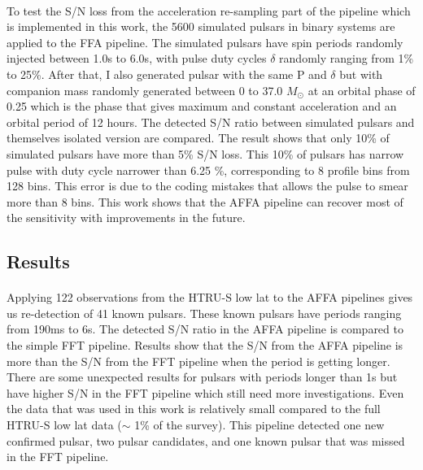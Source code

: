 \documentclass[../chapter1/thesis_msc.tex]{subfiles}
\begin{document}
\paragraph{} To test the S/N loss from the acceleration re-sampling part of the pipeline which is implemented in this work, the 5600 simulated pulsars in binary systems are applied to the FFA pipeline. The simulated pulsars have spin periods randomly injected between 1.0s to 6.0s, with pulse duty cycles $\delta$ randomly ranging from 1\% to 25\%. After that, I also generated pulsar with the same P and $\delta$ but with companion mass randomly generated between 0 to 37.0 $M_\odot$ at an orbital phase of 0.25 which is the phase that gives maximum and constant acceleration and an orbital period of 12 hours. The detected S/N ratio between simulated pulsars and themselves isolated version are compared. The result shows that only 10\% of simulated pulsars have more than 5\% S/N loss. This 10\% of pulsars has narrow pulse with duty cycle narrower than 6.25 \%, corresponding to 8 profile bins from 128 bins. This error is due to the coding mistakes that allows the pulse to smear more than 8 bins. This work shows that the AFFA pipeline can recover most of the sensitivity with improvements in the future. 
\subsection{Results}
\paragraph{} Applying 122 observations from the HTRU-S low lat to the AFFA pipelines gives us re-detection of 41 known pulsars. These known pulsars have periods ranging from 190ms to 6s.  The detected S/N ratio in the AFFA pipeline is compared to the simple FFT pipeline. Results show that the S/N from the AFFA pipeline is more than the S/N from the FFT pipeline when the period is getting longer. There are some unexpected results for pulsars with periods longer than 1s but have higher S/N in the FFT pipeline which still need more investigations. Even the data that was used in this work is relatively small compared to the full HTRU-S low lat data ($\sim$ 1\% of the survey). This pipeline detected one new confirmed pulsar, two pulsar candidates, and one known pulsar that was missed in the FFT pipeline. 
\end{document}

